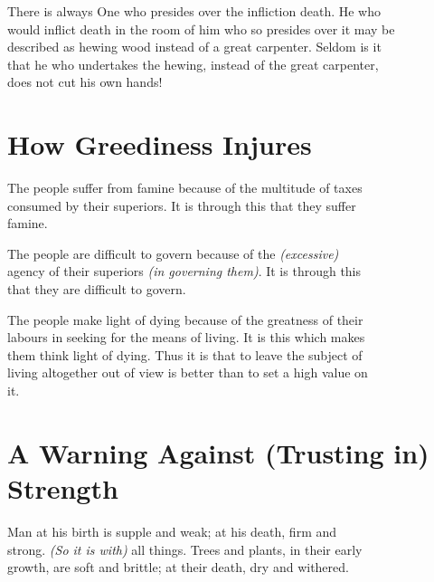     There is always One who presides over the infliction death. He who\\
    would inflict death in the room of him who so presides over it may be\\
    described as hewing wood instead of a great carpenter. Seldom is it\\
    that he who undertakes the hewing, instead of the great carpenter,\\
    does not cut his own hands!\vspace{\baselineskip}
\section*{How Greediness Injures}
    The people suffer from famine because of the multitude of taxes\\
    consumed by their superiors. It is through this that they suffer\\
    famine.\vspace{\baselineskip}
    
    The people are difficult to govern because of the \textit{(excessive)}\\
    agency of their superiors \textit{(in governing them)}. It is through this\\
    that they are difficult to govern.\vspace{\baselineskip}
    
    The people make light of dying because of the greatness of their\\
    labours in seeking for the means of living. It is this which makes\\
    them think light of dying. Thus it is that to leave the subject of\\
    living altogether out of view is better than to set a high value on\\
    it.\vspace{\baselineskip}
    
\section*{A Warning Against (Trusting in) Strength}
    Man at his birth is supple and weak; at his death, firm and\\
    strong. \textit{(So it is with)} all things. Trees and plants, in their early\\
    growth, are soft and brittle; at their death, dry and withered.\vspace{\baselineskip}
    
